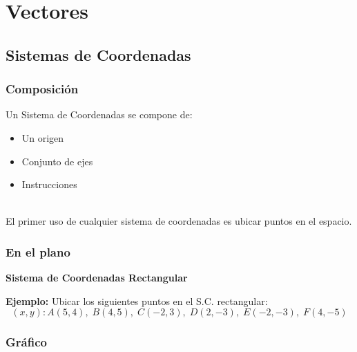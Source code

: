 \chapter{Vectores}

\section{Sistemas de Coordenadas}
\subsection{Composición}

Un Sistema de Coordenadas se compone de:
\begin{itemize}
    \item Un origen
    \item Conjunto de ejes
    \item Instrucciones
\end{itemize}
\\
El primer uso de cualquier sistema de coordenadas es ubicar puntos en el espacio.

\newpage
\subsection{En el plano}
\textbf{Sistema de Coordenadas Rectangular}

\textbf{Ejemplo:} Ubicar los siguientes puntos en el S.C. rectangular:
\[
(x, y): A(5,4), \; B(4,5), \; C(-2,3), \; D(2,-3), \; E(-2,-3), \; F(4,-5)
\]

\subsection{Gráfico}

